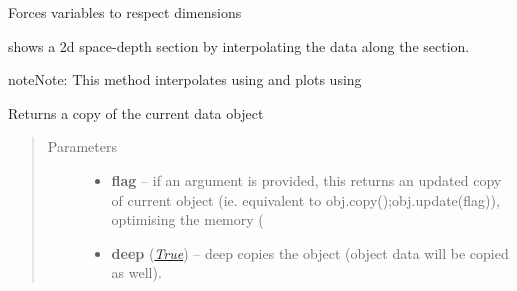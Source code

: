 \documentclass[letterpaper,10pt,english]{sphinxmanual}
\begin{document}
\begin{fulllineitems}

\begin{fulllineitems}
\label{altimetry.data:altimetry.data.hydro_data.check_variables}
Forces variables to respect dimensions

\end{fulllineitems}


\begin{fulllineitems}
\label{altimetry.data:altimetry.data.hydro_data.contour_transect}
shows a 2d space-depth section by interpolating the data along the section.

\begin{notice}{note}{Note:}
This method interpolates using  and plots using 
\end{notice}

\end{fulllineitems}


\begin{fulllineitems}
\label{altimetry.data:altimetry.data.hydro_data.copy}
Returns a copy of the current data object
\begin{quote}\begin{description}
\item[{Parameters}] \leavevmode\begin{itemize}
\item {} 
\textbf{flag} -- if an argument is provided, this returns an updated copy of current object (ie. equivalent to obj.copy();obj.update(flag)), optimising the memory (

\item {} 
\textbf{deep} (\href{http://docs.python.org/library/constants.html\#True}{\emph{True}}) -- deep copies the object (object data will be copied as well).

\end{itemize}


\end{description}
\end{quote}
\end{fulllineitems}
\end{fulllineitems}
\end{document}
